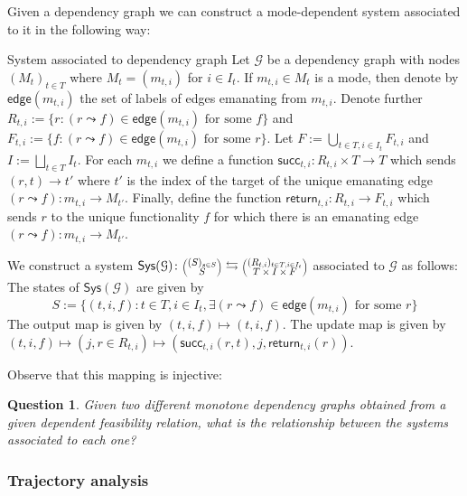 \documentclass[12pt, a4paper]{article}
\theoremstyle{definition}
\theoremstyle{plain}
\theoremstyle{plain}
\theoremstyle{plain}
\theoremstyle{plain}
\newtheorem{question}[counter]{Question}
\theoremstyle{plain}
\theoremstyle{remark}
\theoremstyle{remark}
\newcommand{\mc}[1]{\mathcal{#1}}
\newcommand{\lens}[2]{\scaleobj{0.6}{\begin{pmatrix} \scaleobj{1.3}{{#1}} \\ \scaleobj{1.3}{{#2}} \end{pmatrix}}}
\begin{document}
Given a dependency graph we can construct a mode-dependent system associated to it in the following way:
\begin{tcdefinition}{System associated to dependency graph}{}
	Let $\mc{G}$ be a dependency graph with nodes $(M_t)_{t \in T}$ where $M_t  = (m_{t,i})$ for $i \in I_t$. If $m_{t,i} \in M_t$ is a mode, then denote by $\mathsf{edge}(m_{t,i})$ the set of labels of edges emanating from $m_{t,i}$. Denote further $R_{t,i} := \{ r : (r \leadsto f) \in \mathsf{edge}(m_{t,i}) \text{ for some } f\}$ and $F_{t,i} := \{ f : (r \leadsto f) \in \mathsf{edge}(m_{t,i}) \text{ for some } r\}$. Let $F := \bigcup_{t \in T, i \in I_t} F_{t,i}$ and $I := \bigsqcup_{t \in T} I_t$. For each $m_{t,i}$ we define a function $\mathsf{succ}_{t,i} \colon R_{t,i} \times T \rightarrow T$ which sends $(r,t) \rightarrow t'$ where $t'$ is the index of the target of the unique emanating edge $(r \leadsto f) \colon m_{t,i} \rightarrow M_{t'}$. Finally, define the function $\mathsf{return}_{t,i} \colon R_{t,i} \rightarrow F_{t,i}$ which sends $r$ to the unique functionality $f$ for which there is an emanating edge $(r \leadsto f) \colon m_{t,i} \rightarrow M_{t'}$.
	
	We construct a system $\mathsf{Sys}(\mc{G}) \colon \lens{(S)_{s \in S}}{S} \leftrightarrows \lens{(R_{t,i})_{t \in T, i \in I_t}}{T \times I \times F}$ associated to $\mc{G}$ as follows:
	The states of $\mathsf{Sys}(\mc{G})$ are given by 
	$$S := \{ (t,i,f) : t \in T, i \in I_t, \exists (r \leadsto f) \in \mathsf{edge}(m_{t,i}) \text{ for some } r \}$$
	The output map is given by $(t,i,f) \mapsto (t,i,f)$.
	The update map is given by $ (t,i,f) \mapsto (j,r \in R_{t,i}) \mapsto (\mathsf{succ}_{t,i}(r,t),j, \mathsf{return}_{t,i}(r))$.

	Observe that this mapping is injective:
\end{tcdefinition}

\begin{question}
	Given two different monotone dependency graphs obtained from a given dependent feasibility relation, what is the relationship between the systems associated to each one?
\end{question}

\subsubsection{Trajectory analysis}
\end{document}
